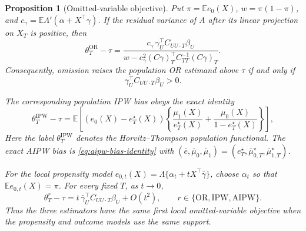 \documentclass[a4paper,10pt,english]{article}
\newtheorem{proposition}{Proposition}[section]
\newcommand{\E}{\mathbb E}
\begin{document}
\begin{proposition}[Omitted-variable objective]
\label{prop:omitted-variable-objective}
Put $\pi=\E e_0(X)$, $w=\pi(1-\pi)$, and
$c_\gamma=\E\Lambda'(\alpha+X^\top\gamma)$.  If the residual variance of
$A$ after its linear projection on $X_T$ is positive, then
\begin{equation}\label{eq:exact-or-ovb}
 \theta_T^{\mathrm{OR}}-\tau
 =\frac{c_\gamma\,
 \gamma_U^\top C_{UU\cdot T}\beta_U}
 {w-c_\gamma^2(C\gamma)_T^\top
 C_{TT}^{-1}(C\gamma)_T}.
\end{equation}
Consequently, omission raises the population OR estimand above $\tau$ if
and only if
\begin{equation}\label{eq:ovb-alignment}
 \gamma_U^\top C_{UU\cdot T}\beta_U>0.
\end{equation}

The corresponding population IPW bias obeys the exact identity
\begin{equation}
 \theta_T^{\mathrm{IPW}}-\tau
 =\E\left[(e_0(X)-e_T^\star(X))\left\{
 \frac{\mu_1(X)}{e_T^\star(X)}
 +\frac{\mu_0(X)}{1-e_T^\star(X)}
 \right\}\right],
 \label{eq:exact-ipw-ovb}
\end{equation}
Here the label $\theta_T^{\mathrm{IPW}}$ denotes the Horvitz--Thompson
population functional.  The exact AIPW bias is
\eqref{eq:aipw-bias-identity} with
$(\bar e,\bar\mu_0,\bar\mu_1)
=(e_T^\star,\bar\mu_{0,T}^\star,\bar\mu_{1,T}^\star)$.

For the local propensity model
$e_{0,t}(X)=\Lambda\{\alpha_t+tX^\top\bar\gamma\}$, choose $\alpha_t$ so
that $\E e_{0,t}(X)=\pi$.  For every fixed $T$, as $t\to0$,
\begin{equation}\label{eq:common-local-ovb}
 \theta_T^r-\tau
 =t\,\bar\gamma_U^\top C_{UU\cdot T}\beta_U+O(t^2),
 \qquad
 r\in\{\mathrm{OR},\mathrm{IPW},\mathrm{AIPW}\}.
\end{equation}
Thus the three estimators have the same first local omitted-variable
objective when the propensity and outcome models use the same support.
\end{proposition}
\end{document}
